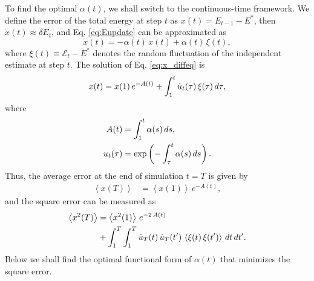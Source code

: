 \documentclass[reprint]{revtex4-1}
\begin{document}
To find the optimal $\alpha(t)$,
we shall switch to the continuous-time framework.
%
We define the error of the total energy at step $t$ as
$x(t) = E_{t-1} - E^*$,
then $\dot x(t) \approx \delta E_t$,
and Eq. \eqref{eq:Eupdate} can be approximated as
%
\begin{equation}
  \dot x(t)
  =
  -\alpha(t) \, x(t) + \alpha(t) \, \xi(t)
  ,
  \label{eq:x_diffeq}
\end{equation}
%
where $\xi(t) \equiv \mathcal E_t - E^*$
denotes the random fluctuation of the independent estimate at step $t$.
%
The solution of Eq. \eqref{eq:x_diffeq} is
%
\begin{equation}
  x(t)
  =
  x(1) \, e^{ -A(t) }
  +
  \int_1^t \dot u_t(\tau) \, \xi(\tau) \, d\tau
  ,
  \notag
\end{equation}
%
where
\begin{align*}
  A(t)
  &=
  \int_1^t \alpha(s) \, ds
  ,
\\
  u_t(\tau)
  &= \exp\left(
    -\int_\tau^t \alpha(s) \, ds
  \right)
  .
  \notag
\end{align*}
%
Thus, the average error at the end of simulation $t = T$
is given by
%
\begin{align}
  \left\langle
    x(T)
  \right\rangle
  &=
  \left\langle
    x(1)
  \right\rangle
  \, e^{ -A(t) }
  ,
  \label{eq:abserr}
\end{align}
%
and the square error
can be measured as
%
\begin{align}
  \left\langle
    x^2(T)
  \right\rangle
  &=
  \left\langle
    x^2(1)
  \right\rangle
  \, e^{ -2 \, A(t) }
  \notag \\
  &+
  \int_1^T
  \int_1^T
  \dot u_T(t) \, \dot u_T(t') \,
  \left\langle
    \xi(t) \, \xi(t')
  \right\rangle
  \, dt \, dt'
  .
  \label{eq:err_functional}
\end{align}
%
Below we shall find the optimal functional form of $\alpha(t)$
that minimizes the square error.



\end{document}
